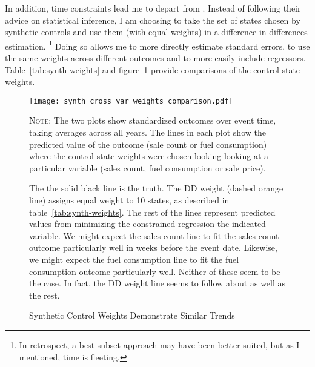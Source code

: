 \documentclass[11pt,letterpaper,oneside]{article}
\begin{document}
\begin{doublespacing}
In addition, time constraints lead me to depart from \textcite{DoudchenkoImbens2016DD}.
Instead of following their advice on statistical inference, I am choosing to take the set of states chosen by synthetic controls and use them (with equal weights) in a difference-in-differences estimation.%
\footnote{In retrospect, a best-subset approach may have been better suited, but as I mentioned, time is fleeting.}
Doing so allows me to more directly estimate standard errors, to use the same weights across different outcomes and to more easily include regressors.
Table~\ref{tab:synth-weights} and figure~\ref{fig:synth-weights} provide comparisons of the control-state weights.


\begin{figure}
    \caption{Synthetic Control Weights Demonstrate Similar Trends}

    \label{fig:synth-weights}
    \texttt{[image: synth\_cross\_var\_weights\_comparison.pdf]}
    {\footnotesize
    \textsc{Note:}
    The two plots show standardized outcomes over event time, taking averages across all years.
    The lines in each plot show the predicted value of the outcome (sale count or fuel consumption) where the control state weights were chosen looking looking at a particular variable (sales count, fuel consumption or sale price).

    The the solid black line is the truth.
    The DD weight (dashed orange line) assigns equal weight to 10 states, as described in table~\ref{tab:synth-weights}.
    The rest of the lines represent predicted values from minimizing the constrained regression the indicated variable.
    We might expect the sales count line to fit the sales count outcome particularly well in weeks before the event date.
    Likewise, we might expect the fuel consumption line to fit the fuel consumption outcome particularly well.
    Neither of these seem to be the case.
    In fact, the DD weight line seems to follow about as well as the rest.

    }
\end{figure}




\end{doublespacing}
\end{document}
